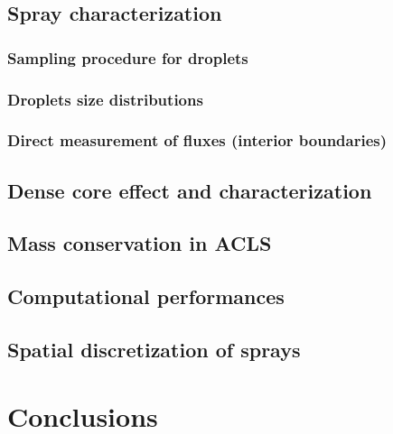 \subsection{Spray characterization}

\subsubsection{Sampling procedure for droplets}

\subsubsection{Droplets size distributions}

\subsubsection{Direct measurement of fluxes (interior boundaries)}
\label{subsubsec:ch5_interior_boundaries}

\subsection{Dense core effect and characterization}
\label{subsec:ch5_dense_core_in_ACLS_simus}

\subsection{Mass conservation in ACLS}

\subsection{Computational performances}
\label{subsubsec:ch5_computational_performances}


\subsection{Spatial discretization of sprays}

\section{Conclusions}

